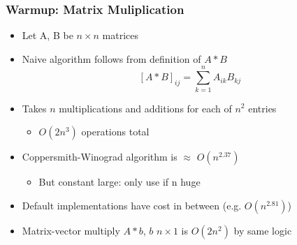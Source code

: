 \documentclass[bigger]{beamer}
\begin{document}
\begin{frame}
\frametitle{Warmup: Matrix Muliplication}
\begin{itemize}
\item Let A, B be $n\times n$ matrices
\item Naive algorithm follows from definition of $A*B$
\begin{equation*}
\left[A*B\right]_{ij}=\sum_{k=1}^{n}A_{ik}B_{kj}
\end{equation*}
\item Takes $n$ multiplications and additions for each of $n^2$ entries 
  \begin{itemize}
    \item $O(2n^3)$ operations total
  \end{itemize}
\item Coppersmith-Winograd algorithm is $\approx$ $O(n^{2.37})$
  \begin{itemize}
    \item But constant large: only use if n huge
  \end{itemize}
\item Default implementations have cost in between (e.g. $O(n^{2.81})$)
\item Matrix-vector multiply $A*b$, $b$ $n\times 1$ is $O(2n^2)$ by same logic

\end{itemize}


\end{frame}
\end{document}
